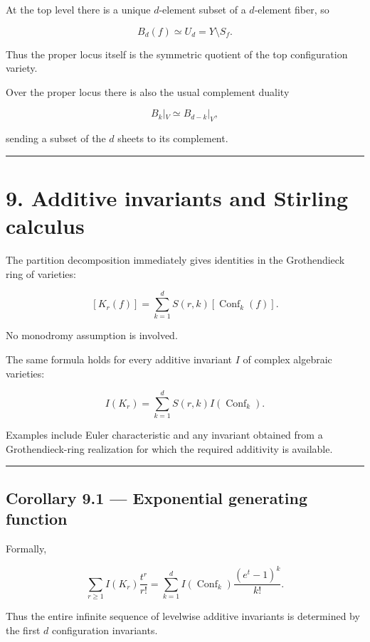 At the top level there is a unique \(d\)-element subset of a
\(d\)-element fiber, so

\[
\boxed{
B_d(f)\simeq U_d=Y\setminus S_f.
}
\]

Thus the proper locus itself is the symmetric quotient of the top
configuration variety.

Over the proper locus there is also the usual complement duality

\[
B_k|_V\simeq B_{d-k}|_V,
\]

sending a subset of the \(d\) sheets to its complement.

\begin{center}\rule{0.5\linewidth}{0.5pt}\end{center}

\section{9. Additive invariants and Stirling
calculus}\label{additive-invariants-and-stirling-calculus}

The partition decomposition immediately gives identities in the
Grothendieck ring of varieties:

\[
\boxed{
[K_r(f)]
=
\sum_{k=1}^d S(r,k)[\operatorname{Conf}_k(f)].
}
\]

No monodromy assumption is involved.

The same formula holds for every additive invariant \(I\) of complex
algebraic varieties:

\[
\boxed{
I(K_r)
=
\sum_{k=1}^d S(r,k)I(\operatorname{Conf}_k).
}
\]

Examples include Euler characteristic and any invariant obtained from a
Grothendieck-ring realization for which the required additivity is
available.

\begin{center}\rule{0.5\linewidth}{0.5pt}\end{center}

\subsection{Corollary 9.1 --- Exponential generating
function}\label{corollary-9.1-exponential-generating-function}

Formally,

\[
\sum_{r\ge1}I(K_r)\frac{t^r}{r!}
=
\sum_{k=1}^d
I(\operatorname{Conf}_k)\frac{(e^t-1)^k}{k!}.
\]

Thus the entire infinite sequence of levelwise additive invariants is
determined by the first \(d\) configuration invariants.

